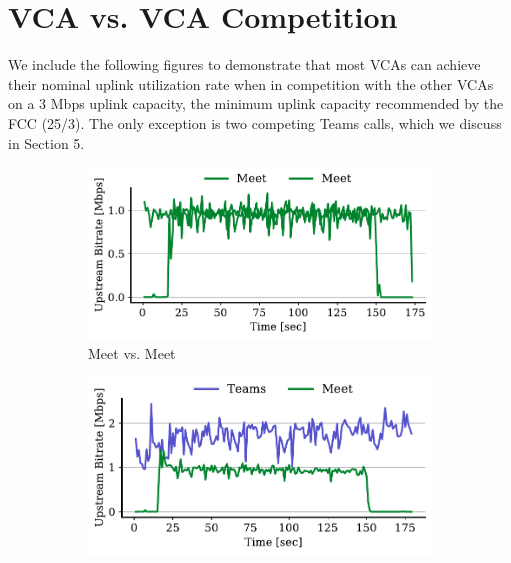 
\newpage
\appendix
\thispagestyle{plain}
\section{VCA vs. VCA Competition}
We include the following figures to demonstrate that most VCAs can achieve their
nominal uplink utilization rate when in competition with the other VCAs on a 
3 Mbps uplink capacity, the minimum uplink capacity recommended by the FCC (25/3). 
The only exception is two competing Teams calls, which we discuss in Section 5. 
\FloatBarrier

\setcounter{figure}{0}
\renewcommand\thefigure{A.\arabic{figure}}

\setcounter{table}{0}
\renewcommand\thetable{A.\arabic{table}}

\begin{figure}[]
\centering
\begin{subfigure}[t]{.4\textwidth}
    \centering
    \includegraphics[width=1\textwidth]{figures/appendix/meet_meet_3_ul_r2.pdf}
    \caption{Meet vs. Meet}
    \label{subfig:meet-meet-3}
\end{subfigure}\hfill
\begin{subfigure}[t]{.4\textwidth}
    \centering
    \includegraphics[width=1\textwidth]{figures/appendix/teams_meet_3_ul_r3.pdf}

\end{subfigure}
\end{figure}
